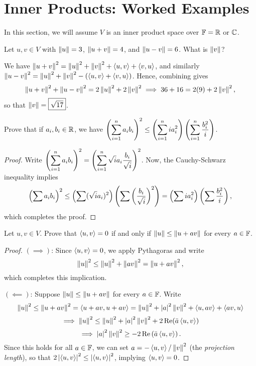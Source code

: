 \documentclass{article}
\begin{document}
\section{Inner Products: Worked Examples}
In this section, we will assume $V$ is an inner product space over $\F = \R$ or $\C$.
\begin{example}
Let $u,v\in V$ with $\norm u = 3$, $\norm{u+v} = 4$, and $\norm{u-v} = 6$. What is $\norm v$?
\end{example}
\begin{solution}
We have $\norm{u+v}^2 = \norm u^2 + \norm v^2 + \gen{u, v} + \gen{v, u}$, and similarly $\norm{u-v}^2 = \norm u^2 + \norm v^2 - \paren{\gen{u, v} + \gen{v, u}}$. Hence, combining gives
$$\norm{u+v}^2 + \norm{u-v}^2 = 2\norm u^2 + 2\norm v^2\implies 36+16 = 2(9) + 2\norm v^2,$$
so that $\norm v = \boxed{\sqrt{17}}$.
\end{solution}
\begin{example}
Prove that if $a_i, b_i\in \R$, we have $\ds\paren{ \sum_{i=1}^n a_ib_i}^2 \leq \paren{\sum_{i=1}^n ia_i^2}\paren{\sum_{i=1}^n \frac{b_i^2}i}$.
\end{example}
\begin{proof}
Write $\ds \paren{ \sum_{i=1}^n a_ib_i}^2 = \paren{ \sum_{i=1}^n \sqrt ia_i\frac{b_i}{\sqrt i}}^2$. Now, the Cauchy-Schwarz inequality implies
$$\paren{\sum a_ib_i}^2 \leq \paren{\sum (\sqrt ia_i)^2}\paren{\sum\paren{\frac{b_i}{\sqrt i}}^2} = \paren{\sum ia_i^2}\paren{\sum \frac{b_i^2}{i}},$$
which completes the proof.
\end{proof}
\begin{example}
Let $u,v\in V$. Prove that $\gen{u,v}= 0$ if and only if $\norm u \leq \norm{u+av}$ for every $a\in\F$. 
\end{example}
\begin{proof}
$(\implies)$: Since $\gen{u,v} = 0$, we apply Pythagoras and write
$$\norm u^2 \leq \norm u^2 + \norm{av}^2 = \norm{u + av}^2,$$
which completes this implication. \newpage

$(\impliedby)$: Suppose $\norm u\leq \norm{u+av}$ for every $a\in\F$. Write
$$\norm u^2 \leq \norm{u+av}^2 = \gen{u+av, u+av} = \norm u^2 + \abs a^2\norm v^2 + \gen{u, av} + \gen{av ,u}$$
$$\implies \norm u^2\leq \norm u^2+\abs a^2\norm v^2 + 2\Re(\bar a\gen{u,v})$$
$$\implies \abs a^2\norm v^2 \geq -2\Re\paren{\bar a\gen{u, v}}.$$
Since this holds for all $a\in \F$, we can set $a = -\gen{u,v}/\norm v^2$ (the \textit{projection length}), so that $2\abs{\gen{u,v}}^2 \leq \abs{\gen {u,v}}^2$, implying $\gen{u,v}=0$.
\end{proof}
\end{document}
